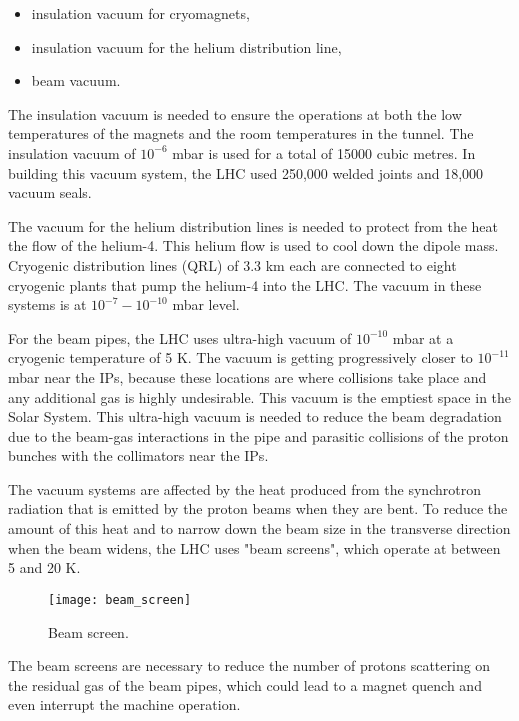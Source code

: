 \begin{normalsize}
\begin{itemize}
\item insulation vacuum for cryomagnets,
\item insulation vacuum for the helium distribution line,
\item beam vacuum.
\end{itemize}


The insulation vacuum is needed to ensure the operations at both the low temperatures of the magnets and the room temperatures in the tunnel. The insulation vacuum of $10^{-6}$ mbar is used for a total of 15000 cubic metres. In building this vacuum system, the LHC used 250,000 welded joints and 18,000 vacuum seals. 


The vacuum for the helium distribution lines is needed to protect from the heat the flow of the helium-4. This helium flow is used to cool down the dipole mass. Cryogenic distribution lines (QRL) of 3.3 km each are connected to eight cryogenic plants that pump the helium-4 into the LHC. The vacuum in these systems is at $10^{-7}-10^{-10}$ mbar level. 



For the beam pipes, the LHC uses ultra-high vacuum of $10^{-10}$ mbar at a cryogenic temperature of 5 K. The vacuum is getting progressively closer to $10^{-11}$ mbar near the IPs, because these locations are where collisions take place and any additional gas is highly undesirable. This vacuum is the emptiest space in the Solar System. This ultra-high vacuum is needed to reduce the beam degradation due to the beam-gas interactions in the pipe and parasitic collisions of the proton bunches with the collimators near the IPs. 

The vacuum systems are affected by the heat produced from the synchrotron radiation that is emitted by the proton beams when they are bent. To reduce the amount of this heat and to narrow down the beam size in the transverse direction when the beam widens, the LHC uses "beam screens", which operate at between 5 and 20 K. 


\begin{figure}[H]
  \centering
  \texttt{[image: beam\_screen]}
  \caption{Beam screen.}\label{beam_screen}
\end{figure}



The beam screens are necessary to reduce the number of protons scattering on the residual gas of the beam pipes, which could lead to a magnet quench and even interrupt the machine operation. 


\end{normalsize}
